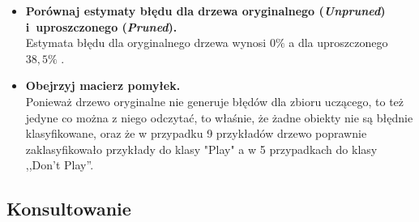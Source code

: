 \begin{itemize}
\item \textbf{Porównaj estymaty błędu dla drzewa oryginalnego (\emph{Unpruned}) i~uproszczonego (\emph{Pruned}).}
	\\Estymata błędu dla oryginalnego drzewa wynosi  $ 0\% $ a dla uproszczonego $ 38,5\% $ .

\item \textbf{Obejrzyj macierz pomyłek.}
	\\Ponieważ drzewo oryginalne nie generuje błędów dla zbioru uczącego, to też jedyne co można z niego odczytać, to właśnie, że żadne obiekty nie są błędnie klasyfikowane, oraz że w przypadku 9 przykładów drzewo poprawnie zaklasyfikowało przykłady do klasy "Play" a w 5 przypadkach do klasy ,,Don't Play''.

\end{itemize}

\subsection{Konsultowanie}

